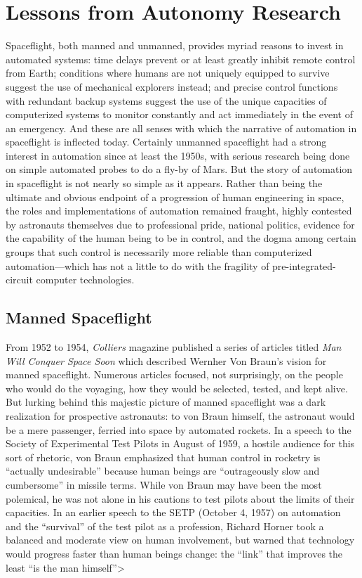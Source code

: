 \section{Lessons from Autonomy Research}

Spaceflight, both manned and unmanned, provides myriad reasons to
invest in automated systems: time delays prevent or at least greatly
inhibit remote control from Earth; conditions where humans are not
uniquely equipped to survive suggest the use of mechanical explorers
instead; and precise control functions with redundant backup systems
suggest the use of the unique capacities of computerized systems to
monitor constantly and act immediately in the event of an emergency.
And these are all senses with which the narrative of automation in
spaceflight is inflected today. Certainly unmanned spaceflight had a
strong interest in automation since at least the 1950s, with serious
research being done on simple automated probes to do a fly-by of
Mars.\cite{???-DMsclass} But the story of automation in spaceflight is
not nearly so simple as it appears. Rather than being the ultimate and
obvious endpoint of a progression of human engineering in space, the
roles and implementations of automation remained fraught, highly
contested by astronauts themselves due to professional pride, national
politics, evidence for the capability of the human being to be in
control, and the dogma among certain groups that such control is
necessarily more reliable than computerized automation---which has not
a little to do with the fragility of pre-integrated-circuit computer
technologies.

\subsection{Manned Spaceflight}

From 1952 to 1954, \emph{Colliers} magazine published a series of articles
titled \emph{Man Will Conquer Space Soon} which described Wernher Von
Braun's vision for manned spaceflight.\cite{???-wiki} Numerous
articles focused, not surprisingly, on the people who would do the
voyaging, how they would be selected, tested, and kept alive. But
lurking behind this majestic picture of manned spaceflight was a dark
realization for prospective astronauts: to von Braun himself, the
astronaut would be a mere passenger, ferried into space by automated
rockets. In a speech to the Society of Experimental Test Pilots in
August of 1959, a hostile audience for this sort of rhetoric, von
Braun emphasized that human control in rocketry is ``actually
undesirable'' because human beings are ``outrageously slow and
cumbersome'' in missile terms.\cite[p. 66-67]{???-DM} While von Braun
may have been the most polemical, he was not alone in his cautions to
test pilots about the limits of their capacities.
In an earlier speech to the SETP (October 4, 1957) on automation and
the ``survival'' of the test pilot as a profession, Richard Horner
took a balanced and moderate view on human involvement, but warned
that technology would progress faster than human beings change:
the ``link'' that improves the least ``is the man himself''\cite[p. 19]{???-DM}>

